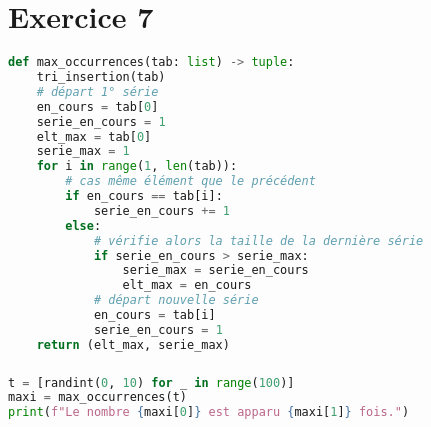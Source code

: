 \documentclass[svgnames,11pt]{beamer}
\begin{document}
\section{Exercice 7}
\begin{frame}[fragile]

\begin{center}
\begin{lstlisting}[language=Python , basicstyle=\ttfamily\small, xleftmargin=0.2em, xrightmargin=-3em]
def max_occurrences(tab: list) -> tuple:
    tri_insertion(tab)
    # départ 1° série
    en_cours = tab[0]
    serie_en_cours = 1
    elt_max = tab[0]
    serie_max = 1
    for i in range(1, len(tab)):
        # cas même élément que le précédent
        if en_cours == tab[i]:
            serie_en_cours += 1
        else:
            # vérifie alors la taille de la dernière série
            if serie_en_cours > serie_max:
                serie_max = serie_en_cours
                elt_max = en_cours
            # départ nouvelle série
            en_cours = tab[i]
            serie_en_cours = 1
    return (elt_max, serie_max)
\end{lstlisting}
\end{center} 

\end{frame}
\begin{frame}[fragile]
    \frametitle{}

\begin{center}
\begin{lstlisting}[language=Python , basicstyle=\ttfamily\small, xleftmargin=0.2em, xrightmargin=-2em]
t = [randint(0, 10) for _ in range(100)]
maxi = max_occurrences(t)
print(f"Le nombre {maxi[0]} est apparu {maxi[1]} fois.")
\end{lstlisting}
\end{center}

\end{frame}
\end{document}
